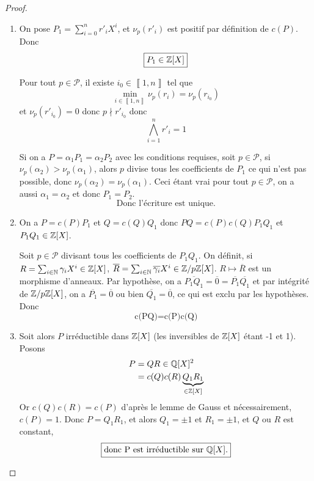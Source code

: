 \begin{proof}
	\phantom{}
	\begin{enumerate}
		\item On pose $P_{1}=\sum_{i=0}^{n}r'_{i}X^{i}$, et $\nu_{p}(r'_{i})$ est positif par définition de $c(P)$. Donc
		\begin{equation}
			\boxed{P_{1}\in\mathbb{Z}[X]}
		\end{equation}
		
		Pour tout $p\in\mathcal{P}$, il existe $i_{0}\in\left\llbracket 1,n\right\rrbracket$ tel que 
		\begin{equation}
			\min\limits_{i\in\left\llbracket 1,n\right\rrbracket}\nu_{p}(r_{i})=\nu_{p}(r_{i_{0}})
		\end{equation}
		et $\nu_{p}(r'_{i_{0}})=0$ donc $p\nmid r'_{i_{0}}$ donc 
		\begin{equation}
			\bigwedge_{i=1}^{n}r'_{i}=1
		\end{equation}

		Si on a $P=\alpha_{1}P_{1}=\alpha_{2}P_{2}$ avec les conditions requises, soit $p\in\mathcal{P}$, si $\nu_{p}(\alpha_{2})>\nu_{p}(\alpha_{1})$, alors $p$ divise tous les coefficients de $P_{1}$ ce qui n'est pas possible, donc $\nu_{p}(\alpha_{2})=\nu_{p}(\alpha_{1})$. Ceci étant vrai pour tout $p\in\mathcal{P}$, on a aussi $\alpha_{1}=\alpha_{2}$ et donc $P_{1}=P_{2}$. 
		\begin{equation}
			\boxed{\text{Donc l'écriture est unique.}}
		\end{equation}

		\item On a $P=c(P)P_{1}$ et $Q=c(Q)Q_{1}$ donc $PQ=c(P)c(Q)P_{1}Q_{1}$ et $P_{1}Q_{1}\in\mathbb{Z}[X]$.
		
		Soit $p\in\mathcal{P}$ divisant tous les coefficients de $P_{1}Q_{1}$. On définit, si $R=\sum_{i\in\mathbb{N}}\gamma_{i}X^{i}\in\mathbb{Z}[X]$, $\overline{R}=\sum_{i\in\mathbb{N}}\overline{\gamma_{i}}X^{i}\in\mathbb{Z}/p\mathbb{Z}[X]$. $R\mapsto\overline{R}$ est un morphisme d'anneaux. Par hypothèse, on a $\overline{P_{1}Q_{1}}=\overline{0}=\overline{P_{1}}\overline{Q_{1}}$ et par intégrité de $\mathbb{Z}/p\mathbb{Z}[X]$, on a $\overline{P_{1}}=\overline{0}$ ou bien $\overline{Q_{1}}=\overline{0}$, ce qui est exclu par les hypothèses. Donc
		\begin{equation}
			\boxed{\text{c(PQ)=c(P)c(Q)}}
		\end{equation}

		\item 
		Soit alors $P$ irréductible dans $\mathbb{Z}[X]$ (les inversibles de $\mathbb{Z}[X]$ étant -1 et 1). Posons 
		\begin{align}
			P
			&=QR\in\mathbb{Q}[X]^{2}\\
			&=c(Q)c(R)\underbrace{Q_{1}R_{1}}_{\in\mathbb{Z}[X]}
		\end{align}
		Or $c(Q)c(R)=c(P)$ d'après le lemme de Gauss et nécessairement, $c(P)=1$. Donc $P=Q_{1}R_{1}$, et alors $Q_{1}=\pm 1$ et $R_{1}=\pm 1$, et $Q$ ou $R$ est constant, 
		\begin{equation}
			\boxed{\text{donc P est irréductible sur }\mathbb{Q}[X].}
		\end{equation}


\end{enumerate}
\end{proof}
